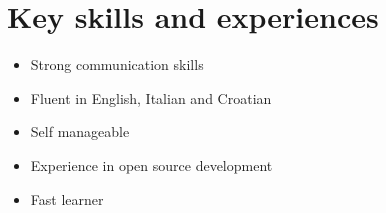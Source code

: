 \section*{Key skills and experiences}
\begin{itemize}
  \item Strong communication skills
  \item Fluent in English, Italian and Croatian
  \item Self manageable
  \item Experience in open source development
  \item Fast learner
\end{itemize}
